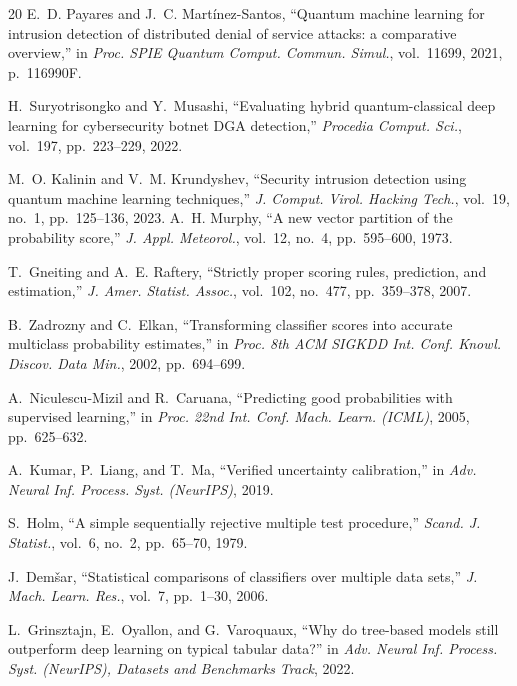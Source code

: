 \documentclass[journal]{IEEEtran}
\begin{document}
\begin{thebibliography}{20}
E.~D. Payares and J.~C. Mart\'inez-Santos,
``Quantum machine learning for intrusion detection of distributed
  denial of service attacks: a comparative overview,'' in
\emph{Proc. SPIE Quantum Comput. Commun. Simul.}, vol.~11699, 2021,
p.~116990F.

H.~Suryotrisongko and Y.~Musashi,
``Evaluating hybrid quantum-classical deep learning for cybersecurity
  botnet DGA detection,'' \emph{Procedia Comput. Sci.}, vol.~197,
pp.~223--229, 2022.

M.~O. Kalinin and V.~M. Krundyshev,
``Security intrusion detection using quantum machine learning
  techniques,'' \emph{J. Comput. Virol. Hacking Tech.}, vol.~19,
no.~1, pp.~125--136, 2023.
A.~H. Murphy, ``A new vector partition of the probability score,''
\emph{J. Appl. Meteorol.}, vol.~12, no.~4, pp.~595--600, 1973.

T.~Gneiting and A.~E. Raftery, ``Strictly proper scoring rules, prediction,
and estimation,'' \emph{J. Amer. Statist. Assoc.}, vol.~102, no.~477,
pp.~359--378, 2007.

B.~Zadrozny and C.~Elkan, ``Transforming classifier scores into accurate
multiclass probability estimates,'' in \emph{Proc. 8th ACM SIGKDD Int.
Conf. Knowl. Discov. Data Min.}, 2002, pp.~694--699.

A.~Niculescu-Mizil and R.~Caruana, ``Predicting good probabilities with
supervised learning,'' in \emph{Proc. 22nd Int. Conf. Mach. Learn.
(ICML)}, 2005, pp.~625--632.

A.~Kumar, P.~Liang, and T.~Ma, ``Verified uncertainty calibration,'' in
\emph{Adv. Neural Inf. Process. Syst. (NeurIPS)}, 2019.

S.~Holm, ``A simple sequentially rejective multiple test procedure,''
\emph{Scand. J. Statist.}, vol.~6, no.~2, pp.~65--70, 1979.

J.~Dem\v{s}ar, ``Statistical comparisons of classifiers over multiple data
sets,'' \emph{J. Mach. Learn. Res.}, vol.~7, pp.~1--30, 2006.

L.~Grinsztajn, E.~Oyallon, and G.~Varoquaux, ``Why do tree-based models
still outperform deep learning on typical tabular data?'' in \emph{Adv.
Neural Inf. Process. Syst. (NeurIPS), Datasets and Benchmarks Track},
2022.


\end{thebibliography}
\end{document}
